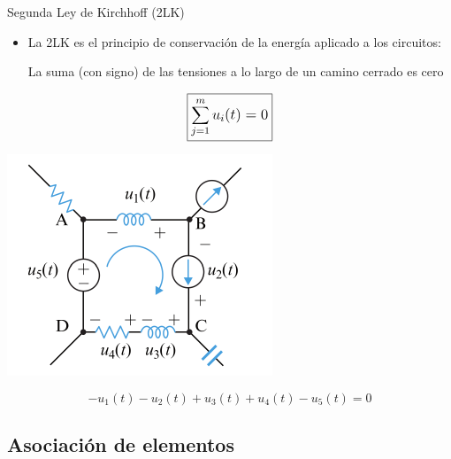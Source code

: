 \documentclass[aspectratio=169, xcolor={usenames,svgnames,dvipsnames}]{beamer}
\begin{document}
\begin{frame}{Segunda Ley de Kirchhoff (2LK)}
    \begin{itemize}
        \item La \alert{2LK} es el principio de conservación de la energía aplicado a los circuitos:
        \vspace{2mm}
        
        La suma (con signo) de las tensiones a lo largo de un camino cerrado es cero        
    \end{itemize}
    \vspace{2mm}
    \begin{equation*}
            \large{\boxed{\sum_{j=1}^m u_i(t)=0}}
        \end{equation*}
    
    \begin{center}
        \includegraphics[height=0.4\textheight]{../figs/LKV_FM.pdf}
    \end{center}
    \[
        - u_1 (t) - u_2 (t) + u_3(t) + u_4 (t) - u_5 (t)    = 0
    \]

\end{frame}






\subsection{Asociación de elementos}
\end{document}
